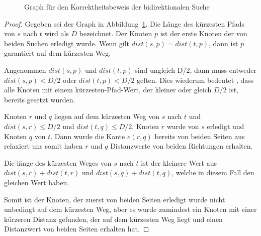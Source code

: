 \begin{figure}[h]
    \centering
    \SetVertexStyle[FillColor=gray,FillOpacity=0.3]
    \caption{Graph für den Korrektheitsbeweis der bidirektionalen Suche}
    \label{fig:bidir_proof}
\end{figure}
\begin{proof}
    Gegeben sei der Graph in Abbildung~\ref{fig:bidir_proof}. Die Länge des kürzesten Pfads von $s$
    nach $t$ wird als $D$ bezeichnet. Der Knoten $p$ ist der erste Knoten der von beiden Suchen
    erledigt wurde. Wenn gilt $dist(s,p) = dist(t,p)$, dann ist $p$ garantiert auf dem kürzesten Weg.

    Angenommen $dist(s,p)$ und $dist(t,p)$ sind ungleich D/2, dann muss entweder ${dist(s,p) < D/2}$
    oder $dist(t,p) < D/2$ gelten. Dies wiederum bedeutet , dass alle Knoten mit einem
    kürzesten-Pfad-Wert, der kleiner oder gleich $D/2$ ist, bereits gesetzt wurden.

    Knoten $r$ und $q$ liegen auf dem kürzesten Weg von $s$ nach $t$ und ${dist(s,r) \le D/2}$ und
    ${dist(t,q) \le D/2}$. Knoten $r$ wurde von $s$ erledigt und Knoten $q$ von $t$. Dann wurde die
    Kante $e(r,q)$ bereits von beiden Seiten aus relaxiert uns somit haben $r$ und $q$ Distanzwerte
    von beiden Richtungen erhalten.

    Die länge des kürzesten Weges von $s$ nach $t$ ist der kleinere Wert aus ${dist(s,r) + dist(t,r)}$
    und ${dist(s,q) + dist(t,q)}$, welche in diesem Fall den gleichen Wert haben.

    Somit ist der Knoten, der zuerst von beiden Seiten erledigt wurde nicht unbedingt auf dem
    kürzesten Weg, aber es wurde zumindest ein Knoten mit einer kürzeren Distanz gefunden, der auf
    dem kürzesten Weg liegt und einen Distanzwert von beiden Seiten erhalten hat.
\end{proof}


